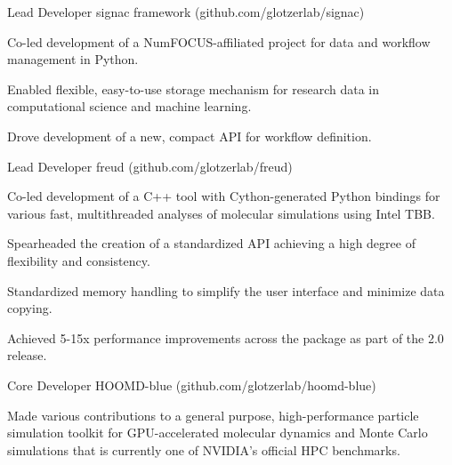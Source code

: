 \begin{cventries}
  \cventry
    {Lead Developer} %
    {signac framework ({\tiny github.com/glotzerlab/signac})} %
    {} %
    {} %
    {
      \begin{cvitems} %
        \item Co-led development of a NumFOCUS-affiliated project for data and workflow management in Python.
        \item Enabled flexible, easy-to-use storage mechanism for research data in computational science and machine learning.
        \item Drove development of a new, compact API for workflow definition.
      \end{cvitems}
    }
  \cventry
    {Lead Developer} %
    {freud ({\tiny github.com/glotzerlab/freud})} %
    {} %
    {} %
    {
      \begin{cvitems} %
        \item Co-led development of a C++ tool with Cython-generated Python bindings for various fast, multithreaded analyses of molecular simulations using Intel TBB.
        \item Spearheaded the creation of a standardized API achieving a high degree of flexibility and consistency.
        \item Standardized memory handling to simplify the user interface and minimize data copying.
        \item Achieved 5-15x performance improvements across the package as part of the 2.0 release.
      \end{cvitems}
    }
  \cventry
    {Core Developer} %
    {HOOMD-blue ({\tiny github.com/glotzerlab/hoomd-blue})} %
    {} %
    {} %
    {
      \begin{cvitems} %
        \item Made various contributions to a general purpose, high-performance particle simulation toolkit for GPU-accelerated molecular dynamics and Monte Carlo simulations that is currently one of NVIDIA's official HPC benchmarks.

\end{cvitems}}
\end{cventries}
